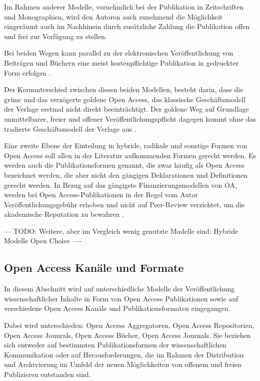 Im Rahmen anderer Modelle, vornehmlich bei der Publikation in Zeitschriften und Monographien, wird den Autoren auch zunehmend die Möglichkeit eingeräumt auch im Nachhinein durch zusätzliche Zahlung die Publikation offen und frei zur Verfügung zu stellen\cite{lewis_2012_inevitability}.

Bei beiden Wegen kann parallel zu der elektronischen Veröffentlichung von Beiträgen und Büchern eine meist kostenpflichtige Publikation in gedruckter Form erfolgen \cite{suchen}.

Der Kernunterschied zwischen diesen beiden Modellen, besteht darin, dass die grüne und das verzögerte goldene Open Access, das klassische Geschäftsmodell der Verlage erstmal nicht direkt beeinträchtigt. Der goldene Weg auf Grundlage unmittelbarer, freier und offener Veröffentlichungspflicht dagegen kommt ohne das tradierte Geschäftsmodell der Verlage aus \cite{lewis_2012_inevitability}.

Eine zweite Ebene der Einteilung in hybride, radikale und sonstige Formen von Open Access soll allen in der Literatur aufkommenden Formen gerecht werden. Es werden auch die Publikationsformen genannt, die zwar häufig als Open Access bezeichnet werden, die aber nicht den gängigen Deklarationen \cite{boai_2012} und Definitionen gerecht werden. In Bezug auf das gängigste Finanzierungsmodellen von OA, werden bei Open Access-Publikationen in der Regel vom Autor Veröffentlichungsgebühr erhoben und nicht auf Peer-Review verzichtet, um die akademische Reputation zu bewahren \cite{albert_2006_open_implications} \cite{Open_Access_net_2009}.

--- TODO: Weitere, aber im Vergleich wenig genutzte Modelle sind:
Hybride Modelle
Open Choice \cite{Hess_2006} 
----

\subsection{Open Access Kanäle und Formate}
In diesem Abschnitt wird auf unterschiedliche Modelle der Veröffentlichung wissenschaftlicher Inhalte in Form von Open Access Publikationen sowie auf verschiedene Open Access Kanäle und Publikationsformaten eingegangen.

Dabei wird unterschieden: Open Access Aggregatoren, Open Access Repositorien, Open Access Jounrals, Open Access Bücher, Open Access Journals. Sie beziehen sich entweder auf bestimmten Publikationsformen der wissenschaftlichen Kommunikation oder auf Herausforderungen, die im Rahmen der Distribution und Archivierung im Umfeld der neuen Möglichkeiten von offenem und freien Publizieren entstanden sind. 

